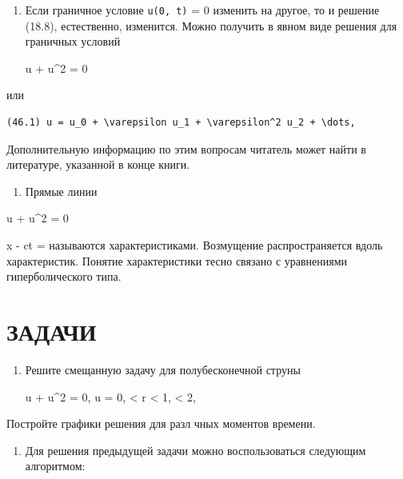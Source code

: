 \documentclass[
  ukrainian,
]{article}
\providecommand{\tightlist}{%
  \setlength{\itemsep}{0pt}\setlength{\parskip}{0pt}}
\begin{document}
\begin{enumerate}
\def\labelenumi{\arabic{enumi}.}
\setcounter{enumi}{1}
\item
  Если граничное условие \texttt{u(0,\ t)} = 0 изменить на другое, то и
  решение (18.8), естественно, изменится. Можно получить в явном виде
  решения для граничных условий

  \Delta u + \varepsilon u\^{}2 = 0
\end{enumerate}

или

\begin{verbatim}
(46.1) u = u_0 + \varepsilon u_1 + \varepsilon^2 u_2 + \dots,
\end{verbatim}

Дополнительную информацию по этим вопросам читатель может найти в
литературе, указанной в конце книги.

\begin{enumerate}
\def\labelenumi{\arabic{enumi}.}
\setcounter{enumi}{2}
\tightlist
\item
  Прямые линии
\end{enumerate}

 u + u\^{}2 = 0

x - ct =  называются характеристиками. Возмущение
распространяется вдоль характеристик. Понятие характеристики тесно
связано с уравнениями гиперболического типа.

\section{ЗАДАЧИ}\label{ux437ux430ux434ux430ux447ux438-4}

\begin{enumerate}
\def\labelenumi{\arabic{enumi}.}
\item
  Решите смещанную задачу для полубесконечной струны

  \Delta u + u\^{}2 = 0, \Delta u = 0,  \textless{} r \textless{}
  1,  \le \theta \textless{} 2\pi,
\end{enumerate}

Постройте графики решения для разл чных моментов времени.

\begin{enumerate}
\def\labelenumi{\arabic{enumi}.}
\setcounter{enumi}{1}
\tightlist
\item
  Для решения предыдущей задачи можно воспользоваться следующим
  алгоритмом:
\end{enumerate}
\end{document}
